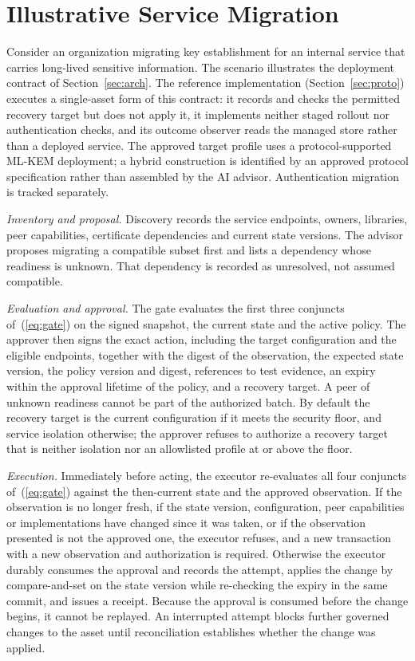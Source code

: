 \section{Illustrative Service Migration}
\label{sec:scenario}
Consider an organization migrating key establishment for an internal service that carries long-lived sensitive information. The scenario illustrates the deployment contract of Section~\ref{sec:arch}. The reference implementation (Section~\ref{sec:proto}) executes a single-asset form of this contract: it records and checks the permitted recovery target but does not apply it, it implements neither staged rollout nor authentication checks, and its outcome observer reads the managed store rather than a deployed service. The approved target profile uses a protocol-supported ML-KEM deployment; a hybrid construction is identified by an approved protocol specification rather than assembled by the AI advisor. Authentication migration is tracked separately.

\emph{Inventory and proposal.} Discovery records the service endpoints, owners, libraries, peer capabilities, certificate dependencies and current state versions. The advisor proposes migrating a compatible subset first and lists a dependency whose readiness is unknown. That dependency is recorded as unresolved, not assumed compatible.

\emph{Evaluation and approval.} The gate evaluates the first three conjuncts of~(\ref{eq:gate}) on the signed snapshot, the current state and the active policy. The approver then signs the exact action, including the target configuration and the eligible endpoints, together with the digest of the observation, the expected state version, the policy version and digest, references to test evidence, an expiry within the approval lifetime of the policy, and a recovery target. A peer of unknown readiness cannot be part of the authorized batch. By default the recovery target is the current configuration if it meets the security floor, and service isolation otherwise; the approver refuses to authorize a recovery target that is neither isolation nor an allowlisted profile at or above the floor.

\emph{Execution.} Immediately before acting, the executor re-evaluates all four conjuncts of~(\ref{eq:gate}) against the then-current state and the approved observation. If the observation is no longer fresh, if the state version, configuration, peer capabilities or implementations have changed since it was taken, or if the observation presented is not the approved one, the executor refuses, and a new transaction with a new observation and authorization is required. Otherwise the executor durably consumes the approval and records the attempt, applies the change by compare-and-set on the state version while re-checking the expiry in the same commit, and issues a receipt. Because the approval is consumed before the change begins, it cannot be replayed. An interrupted attempt blocks further governed changes to the asset until reconciliation establishes whether the change was applied.

